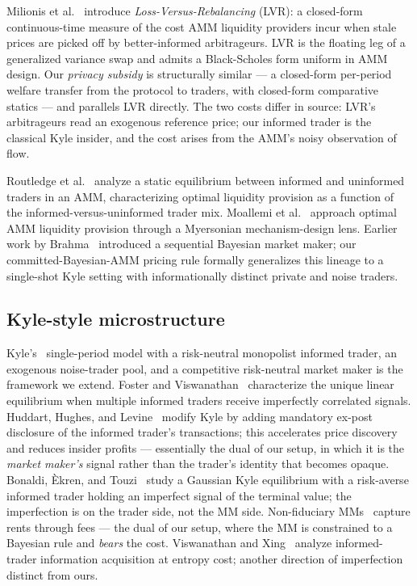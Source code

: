 \documentclass[runningheads]{llncs}
\begin{document}
\begin{sloppypar}
Milionis et al.~\cite{milionis2022lvr} introduce
\emph{Loss-Versus-Rebalancing} (LVR): a closed-form continuous-time
measure of the cost AMM liquidity providers incur when stale prices
are picked off by better-informed arbitrageurs. LVR is the floating
leg of a generalized variance swap and admits a Black-Scholes form
uniform in AMM design. Our \emph{privacy subsidy} is structurally
similar --- a closed-form per-period welfare transfer from the
protocol to traders, with closed-form comparative statics --- and
parallels LVR directly. The two costs differ in source: LVR's
arbitrageurs read an exogenous reference price; our informed trader
is the classical Kyle insider, and the cost arises from the AMM's
noisy observation of flow.
\end{sloppypar}

Routledge et al.~\cite{routledge2024amm} analyze a static
equilibrium between informed and uninformed traders in an AMM,
characterizing optimal liquidity provision as a function of the
informed-versus-uninformed trader mix. Moallemi et
al.~\cite{moallemi2022myersonian} approach optimal AMM liquidity
provision through a Myersonian mechanism-design lens. Earlier work
by Brahma~\cite{brahma-bayesian-mm} introduced a sequential
Bayesian market maker; our committed-Bayesian-AMM pricing rule
formally generalizes this lineage to a single-shot Kyle setting
with informationally distinct private and noise traders.

\subsection{Kyle-style microstructure}

Kyle's~\cite{kyle1985} single-period model with a risk-neutral
monopolist informed trader, an exogenous noise-trader pool, and a
competitive risk-neutral market maker is the framework we extend.
Foster and Viswanathan~\cite{foster1996multiple} characterize the
unique linear equilibrium when multiple informed traders receive
imperfectly correlated signals. Huddart, Hughes, and
Levine~\cite{huddart2001disclosure} modify Kyle by adding mandatory
ex-post disclosure of the informed trader's transactions; this
accelerates price discovery and reduces insider profits ---
essentially the dual of our setup, in which it is the
\emph{market maker's} signal rather than the trader's identity that
becomes opaque. Bonaldi, Èkren, and
Touzi~\cite{bonaldi2025solvability} study a Gaussian Kyle
equilibrium with a risk-averse informed trader holding an imperfect
signal of the terminal value; the imperfection is on the trader
side, not the MM side. Non-fiduciary MMs~\cite{nonfiduciary-mm}
capture rents through fees --- the dual of our setup, where the MM
is constrained to a Bayesian rule and \emph{bears} the cost.
Viswanathan and Xing~\cite{flexible-info-kyle} analyze
informed-trader information acquisition at entropy cost; another
direction of imperfection distinct from ours.
\end{document}
